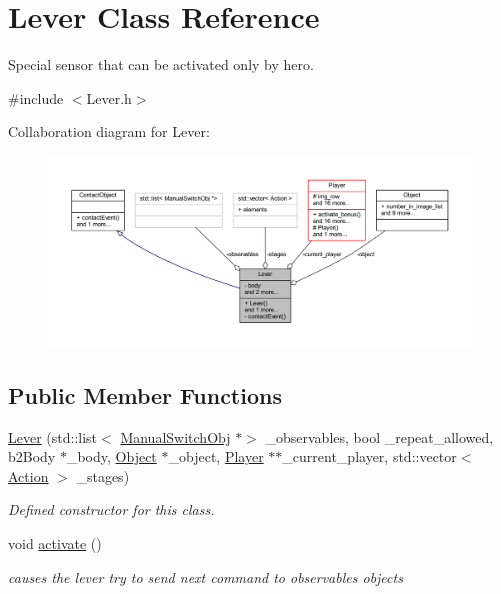 \hypertarget{class_lever}{}\section{Lever Class Reference}
\label{class_lever}


Special sensor that can be activated only by hero.  




{\ttfamily \#include $<$Lever.\+h$>$}



Collaboration diagram for Lever\+:
\nopagebreak
\begin{figure}[H]
\begin{center}
\leavevmode
\includegraphics[width=350pt]{class_lever__coll__graph}
\end{center}
\end{figure}
\subsection*{Public Member Functions}
\begin{DoxyCompactItemize}
\item 
\hyperlink{class_lever_a2b4dd6cea65837c09711dda3d02d7cae}{Lever} (std\+::list$<$ \hyperlink{class_manual_switch_obj}{Manual\+Switch\+Obj} $\ast$$>$ \+\_\+observables, bool \+\_\+repeat\+\_\+allowed, b2\+Body $\ast$\+\_\+body, \hyperlink{class_object}{Object} $\ast$\+\_\+object, \hyperlink{class_player}{Player} $\ast$$\ast$\+\_\+current\+\_\+player, std\+::vector$<$ \hyperlink{_manual_switch_obj_8h_a8bb1ef53467e4f61410d12822d922498}{Action} $>$ \+\_\+stages)
\begin{DoxyCompactList}\small\item\em Defined constructor for this class. \end{DoxyCompactList}\item 
\mbox{\label{class_lever_a0aafb7fa0e219a59362cfdbdc30f6203}} 
void \hyperlink{class_lever_a0aafb7fa0e219a59362cfdbdc30f6203}{activate} ()
\begin{DoxyCompactList}\small\item\em causes the lever try to send next command to observables objects \end{DoxyCompactList}\end{DoxyCompactItemize}
